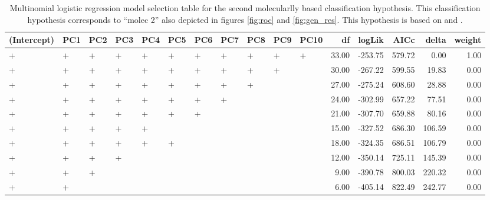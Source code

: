 \documentclass[12pt,letterpaper]{article}\usepackage{graphicx, color}
\begin{document}
\begin{table}
  \centering
{\small
\begin{tabular}{lllllllllllrrrrr}
  \hline
(Intercept) & PC1 & PC2 & PC3 & PC4 & PC5 & PC6 & PC7 & PC8 & PC9 & PC10 & df & logLik & AICc & delta & weight \\ 
  \hline
+ & + & + & + & + & + & + & + & + & + & + & 33.00 & -253.75 & 579.72 & 0.00 & 1.00 \\ 
  + & + & + & + & + & + & + & + & + & + &  & 30.00 & -267.22 & 599.55 & 19.83 & 0.00 \\ 
  + & + & + & + & + & + & + & + & + &  &  & 27.00 & -275.24 & 608.60 & 28.88 & 0.00 \\ 
  + & + & + & + & + & + & + & + &  &  &  & 24.00 & -302.99 & 657.22 & 77.51 & 0.00 \\ 
  + & + & + & + & + & + & + &  &  &  &  & 21.00 & -307.70 & 659.88 & 80.16 & 0.00 \\ 
  + & + & + & + & + &  &  &  &  &  &  & 15.00 & -327.52 & 686.30 & 106.59 & 0.00 \\ 
  + & + & + & + & + & + &  &  &  &  &  & 18.00 & -324.35 & 686.51 & 106.79 & 0.00 \\ 
  + & + & + & + &  &  &  &  &  &  &  & 12.00 & -350.14 & 725.11 & 145.39 & 0.00 \\ 
  + & + & + &  &  &  &  &  &  &  &  & 9.00 & -390.78 & 800.03 & 220.32 & 0.00 \\ 
  + & + &  &  &  &  &  &  &  &  &  & 6.00 & -405.14 & 822.49 & 242.77 & 0.00 \\ 
   \hline
\end{tabular}
}


\caption{Multinomial logistic regression model selection table for the second molecularlly based classification hypothesis. This classification hypothesis corresponds to ``molec 2'' also depicted in figures \ref{fig:roc} and \ref{fig:gen_res}. This hypothesis is based on \citet{Spinks2005} and \citet{Spinks2010}.}
  \label{tab:mod_sel_4}
\end{table}
\end{document}

